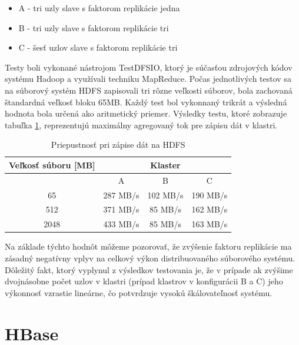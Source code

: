 \documentclass[11pt,twoside,a4paper]{book}
\begin{document}
\begin{itemize}
 \item A - tri uzly slave s faktorom replikácie jedna
 \item B - tri uzly slave s faktorom replikácie tri
 \item C - šesť uzlov slave s faktorom replikácie tri
\end{itemize}

Testy boli vykonané nástrojom TestDFSIO, ktorý je súčasťou zdrojových kódov systému Hadoop a využívali techniku MapReduce. Počas jednotlivých testov sa na súborový systém HDFS zapisovali tri rôzne veľkosti súborov, bola zachovaná štandardná veľkosť bloku 65MB. Každý test bol vykonnaný trikrát a výsledná hodnota bola určená ako aritmetický priemer. Výsledky testu, ktoré zobrazuje tabuľka \ref{tab:HDFSperformance}, reprezentujú maximálny agregovaný tok pre zápisu dát v klastri.

\begin{table}[hp]
\begin{center}
\begin{tabular}{|c|c|c|c|}
\hline 
\multirow{2}{*}{Veľkosť súboru [MB]} & \multicolumn{3}{|c|}{Klaster}  \\
\hline & A & B & C\\
\hline 65 & 287 MB/s& 102 MB/s& 190 MB/s\\ 
\hline 512 & 371 MB/s& 85 MB/s& 162 MB/s\\ 
\hline 2048 & 433 MB/s& 85 MB/s& 163 MB/s\\ 
\hline
\end{tabular} 
\end{center}
\caption{Priepustnosť pri zápise dát na HDFS}
\label{tab:HDFSperformance}
\end{table}

Na základe týchto hodnôt môžeme pozorovať, že zvýšenie faktoru replikácie ma zásadný negatívny vplyv na celkový výkon distribuovaného súborového systému. Dôležitý fakt, ktorý vyplynul z výsledkov testovania je, že v prípade ak zvýšime dvojnásobne počet uzlov v klastri (prípad klastrov v konfigurácii B a C) jeho výkonnosť vzrastie lineárne, čo potvrdzuje vysokú škálovateľnosť systému. 


\section{HBase}
\end{document}
